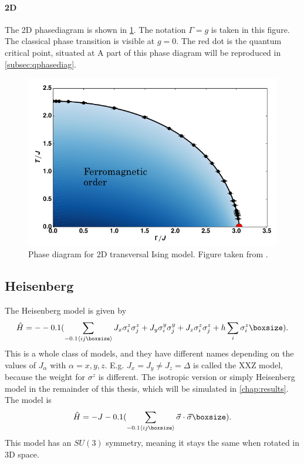 \paragraph{2D}

The 2D phasediagram is shown in \cref{2dtisingphasediag}. The notation $\Gamma=g$ is taken in this figure. The classical phase transition is visible at $g=0$. The red dot is the quantum critical point, situated at  A part of this phase diagram will be reproduced in \cref{subsec:qphasediag}.

\begin{figure}[h!]
    \center
    \includegraphics[width=\textwidth]{Figuren/phsyics/2disingphase.png}
    \caption{Phase diagram for 2D transversal Ising model. Figure taken from \cite{Hesselmann2016}.}
    \label{2dtisingphasediag}
\end{figure}

\subsection{Heisenberg}

The Heisenberg model is given by
\begin{equation}
    \hat{H} =  -\left( \sum_{\Braket{i j }} J_x \sigma^z_i \sigma^z_j + J_y \sigma^y_i \sigma^y_j+ J_z \sigma^z_i \sigma^z_j + h \sum_i \sigma^z_i \right ).
\end{equation}
This is a whole class of models, and they have different names depending on the values of $J_{\alpha} $ with $\alpha=x,y,z$. E.g. $J_x = J_y \neq J_z = \Delta$ is called the XXZ model, because the weight for $\sigma^z$ is different. The isotropic version or simply Heisenberg model in the remainder of this thesis, which will be simulated in \cref{chap:results}. The model is
\begin{equation}
    \hat{H} =  -J \left( \sum_{\Braket{i j }} \vec{\sigma} \cdot \vec{\sigma} \right ).
\end{equation}
This model has an $SU(3)$ symmetry, meaning it stays the same when rotated in 3D space.

